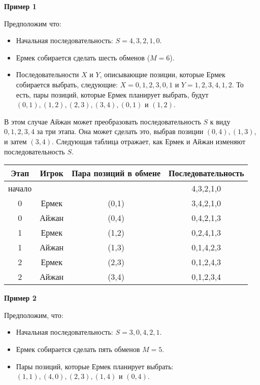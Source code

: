 \textbf{Пример 1}

Предположим что:
\begin{itemize}
\item Начальная последовательность: $S=4,3,2,1,0$.
\item Ермек собирается сделать шесть обменов ($M=6$).
\item Последовательности $X$ и $Y$, описывающие позиции, которые Ермек собирается выбрать,
следующие: $X=0,1,2,3,0,1$ и $Y=1,2,3,4,1,2$. То есть, пары позиций, которые
Ермек планирует выбрать, будут $(0,1), (1,2), (2,3), (3,4), (0,1)$ и $(1,2)$.
\end{itemize}

В этом случае Айжан может преобразовать последовательность $S$ к виду $0,1,2,3,4$ за три
этапа. Она может сделать это, выбрав позиции $(0,4), (1,3)$, и затем $(3,4)$.
Следующая таблица отражает, как Ермек и Айжан изменяют последовательность $S$.
\begin{center}
\begin{tabular}{|c|c|c|c|}
\hline
Этап & Игрок & Пара позиций в обмене & Последовательность\\
\hline
начало & & & 4,3,2,1,0\\
\hline
0 & Ермек & (0,1) & 3,4,2,1,0\\ 
\hline
0 & Айжан & (0,4) & 0,4,2,1,3\\
\hline
1 & Ермек & (1,2) & 0,2,4,1,3\\
\hline
1 & Айжан & (1,3) & 0,1,4,2,3\\
\hline
2 & Ермек & (2,3) & 0,1,2,4,3\\
\hline
2 & Айжан & (3,4) & 0,1,2,3,4\\
\hline
\end{tabular}
\end{center}
\textbf{Пример 2}

Предположим, что:
\begin{itemize}
\item Начальная последовательность: $S = 3,0,4,2,1$.
\item Ермек собирается сделать пять обменов $M = 5$.
\item Пары позиций, которые Ермек планирует выбрать: $(1,1), (4,0), (2,3), (1,4)$ и $(0,4)$.
\end{itemize}

